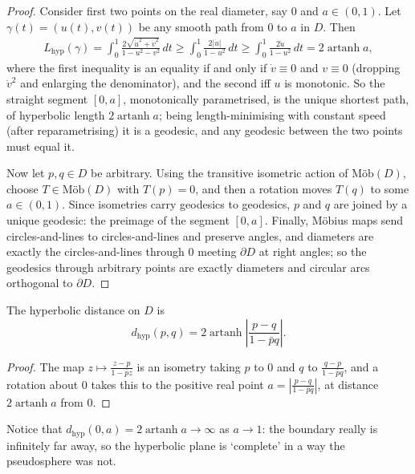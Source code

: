 \documentclass[a4paper]{scrartcl}
\newcommand{\Mob}{\text{M\"ob}}
\DeclareMathOperator{\artanh}{artanh}
\begin{document}
\begin{proof}
    Consider first two points on the real diameter, say $0$ and $a \in (0, 1)$. Let $\gamma(t) = (u(t), v(t))$ be any smooth path from $0$ to $a$ in $D$. Then
    \begin{align*}
    L_{\mathrm{hyp}}(\gamma) = \int_0^1 \frac{2\sqrt{\dot u^2 + \dot v^2}}{1 - u^2 - v^2}\, dt \geq \int_0^1 \frac{2 |\dot u|}{1 - u^2} \, dt \geq \int_0^1 \frac{2 \dot u}{1 - u^2} \, dt = 2 \artanh a,
    \end{align*}
    where the first inequality is an equality if and only if $\dot v \equiv 0$ and $v \equiv 0$ (dropping $\dot v^2$ and enlarging the denominator), and the second iff $u$ is monotonic. So the straight segment $[0, a]$, monotonically parametrised, is the unique shortest path, of hyperbolic length $2 \artanh a$; being length-minimising with constant speed (after reparametrising) it is a geodesic, and any geodesic between the two points must equal it.

    Now let $p, q \in D$ be arbitrary. Using the transitive isometric action of $\Mob(D)$, choose $T \in \Mob(D)$ with $T(p) = 0$, and then a rotation moves $T(q)$ to some $a \in (0, 1)$. Since isometries carry geodesics to geodesics, $p$ and $q$ are joined by a unique geodesic: the preimage of the segment $[0, a]$. Finally, M\"obius maps send circles-and-lines to circles-and-lines and preserve angles, and diameters are exactly the circles-and-lines through $0$ meeting $\partial D$ at right angles; so the geodesics through arbitrary points are exactly diameters and circular arcs orthogonal to $\partial D$.
\end{proof}

\begin{corollary}
    The hyperbolic distance on $D$ is
    $$
    d_{\mathrm{hyp}}(p, q) = 2 \artanh \left|\frac{p - q}{1 - \bar p q}\right|.
    $$
\end{corollary}
\begin{proof}
    The map $z \mapsto \frac{z - p}{1 - \bar p z}$ is an isometry taking $p$ to $0$ and $q$ to $\frac{q - p}{1 - \bar p q}$, and a rotation about $0$ takes this to the positive real point $a = \left|\frac{p - q}{1 - \bar p q}\right|$, at distance $2\artanh a$ from $0$.
\end{proof}

Notice that $d_{\mathrm{hyp}}(0, a) = 2 \artanh a \rightarrow \infty$ as $a \rightarrow 1$: the boundary really is infinitely far away, so the hyperbolic plane is `complete' in a way the pseudosphere was not.
\end{document}
